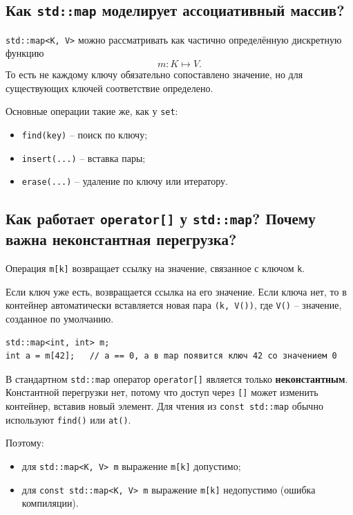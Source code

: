 \subsection{Как \texttt{std::map} моделирует ассоциативный массив?}
\texttt{std::map<K, V>} можно рассматривать как частично определённую дискретную функцию
\[
m : K \mapsto V.
\]
То есть не каждому ключу обязательно сопоставлено значение, но для существующих ключей соответствие определено.

Основные операции такие же, как у \texttt{set}:
\begin{itemize}
    \item \texttt{find(key)} -- поиск по ключу;
    \item \texttt{insert(...)} -- вставка пары;
    \item \texttt{erase(...)} -- удаление по ключу или итератору.
\end{itemize}

\subsection{Как работает \texttt{operator[]} у \texttt{std::map}? Почему важна неконстантная перегрузка?}
Операция \texttt{m[k]} возвращает ссылку на значение, связанное с ключом \texttt{k}.

Если ключ уже есть, возвращается ссылка на его значение.  
Если ключа нет, то в контейнер автоматически вставляется новая пара \texttt{(k, V())}, где \texttt{V()} -- значение, созданное по умолчанию.

\begin{example}
\begin{verbatim}
std::map<int, int> m;
int a = m[42];   // a == 0, а в map появится ключ 42 со значением 0
\end{verbatim}
\end{example}

\begin{remark}
В стандартном \texttt{std::map} оператор \texttt{operator[]} является только \textbf{неконстантным}. Константной перегрузки нет, потому что доступ через \texttt{[]} может изменить контейнер, вставив новый элемент. Для чтения из \texttt{const std::map} обычно используют \texttt{find()} или \texttt{at()}.
\end{remark}

Поэтому:
\begin{itemize}
    \item для \texttt{std::map<K, V> m} выражение \texttt{m[k]} допустимо;
    \item для \texttt{const std::map<K, V> m} выражение \texttt{m[k]} недопустимо (ошибка компиляции).
\end{itemize}

